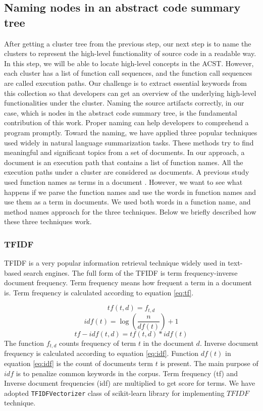 \subsection{Naming nodes in an abstract code summary tree}
\label{approach_naming}
After getting a cluster tree from the previous step, our next step is to name the clusters to represent the high-level functionality of source code in a readable way. In this step, we will be able to locate high-level concepts in the ACST. However, each cluster has a list of function call sequences, and the function call sequences are called execution paths. Our challenge is to extract essential keywords from this collection so that developers can get an overview of the underlying high-level functionalities under the cluster. Naming the source artifacts correctly, in our case, which is nodes in the abstract code summary tree, is the fundamental contribution of this work. Proper naming can help developers to comprehend a program promptly. Toward the naming, we have applied three popular techniques used widely in natural language summarization tasks. These methods try to find meaningful and significant topics from a set of documents. In our approach, a document is an execution path that contains a list of function names. All the execution paths under a cluster are considered as documents.
A previous study used function names as terms in a document \cite{gharibi2018automatic}. However, we want to see what happens if we parse the function names and use the words in function names and use them as a term in documents. We used both words in a function name, and method names approach for the three techniques. Below we briefly described how these three techniques work. 

\subsubsection{TFIDF}
TFIDF \cite{ramos2003using} is a very popular information retrieval technique widely used in text-based search engines. The full form of the TFIDF is term frequency-inverse document frequency. Term frequency means how frequent a term in a document is. Term frequency is calculated according to equation \ref{eq:tf}.

\begin{equation}
    tf(t,d) = f_{t,d}
    \label{eq:tf}
\end{equation}
\begin{equation}
    idf(t) = \log(\frac{n}{df(t)})+1
    \label{eq:idf}
\end{equation}
\begin{equation}
    tf-idf(t,d) = tf(t,d) * idf(t)
    \label{eq:TFIDF}
\end{equation}
The function $f_{t,d}$ counts frequency of term $t$ in the document $d$. Inverse document frequency is calculated according to equation \ref{eq:idf}. Function $df(t)$ in equation \ref{eq:idf} is the count of documents term $t$ is present. The main purpose of $idf$ is to penalize common keywords in the corpus. Term frequency (tf) and Inverse document frequencies (idf) are multiplied to get score for terms. We have adopted \texttt{TFIDFVectorizer} class of scikit-learn \cite{scikit-learn} library for implementing $TFIDF$ technique.
